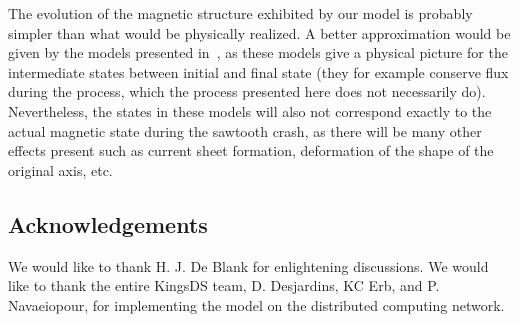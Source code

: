 \documentclass[%
superscriptaddress,
amsmath,amssymb,
aps,
pre,
floatfix,
]{revtex4-2}
\begin{document}
The evolution of the magnetic structure exhibited by our model is probably simpler than what would be physically realized. 
A better approximation would be given by the models presented in~\cite{kolesnichenko1996theory, jaulmes2014redistribution}, as these models give a physical picture for the intermediate states between initial and final state (they for example conserve flux during the process, which the process presented here does not necessarily do). 
Nevertheless, the states in these models will also not correspond exactly to the actual magnetic state during the sawtooth crash, as there will be many other effects present such as current sheet formation, deformation of the shape of the original axis, etc.

\subsection*{Acknowledgements}
We would like to thank H. J. De Blank for enlightening discussions. We would like to thank the entire KingsDS team, D. Desjardins, KC Erb, and P. Navaeiopour, for implementing the model on the distributed computing network. 



\end{document}
